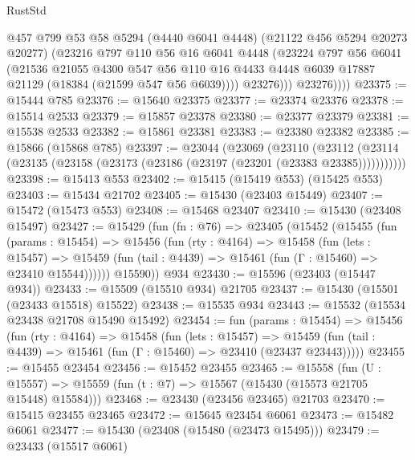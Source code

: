\begin{lexlean}{RustStd}
\begin{coremodule}
{\begin{coremodule}
{{{{{{{{{{{{{{{{{{{{{{{{{{{{{{{{{{{{{{{{{{{{{{{{{{{{{{{{{{{{                @457
                @799
                @53
                @58
                @5294
                (@4440 @6041 @4448)
                (@21122 @456 @5294 @20273 @20277)
                (@23216
                  @797
                  @110
                  @56
                  @16
                  @6041
                  @4448
                  (@23224
                    @797
                    @56
                    @6041
                    (@21536
                      @21055
                      @4300
                      @547
                      @56
                      @110
                      @16
                      @4433
                      @4448
                      @6039
                      @17887
                      @21129
                      (@18384 (@21599 @547 @56 @6039))))
                  @23276)))
            @23276))))
@23375 := @15444 @785
@23376 := @15640 @23375
@23377 := @23374 @23376
@23378 := @15514 @2533
@23379 := @15857 @23378
@23380 := @23377 @23379
@23381 := @15538 @2533
@23382 := @15861 @23381
@23383 := @23380 @23382
@23385 := @15866 (@15868 @785)
@23397 := @23044
    (@23069
      (@23110
        (@23112 (@23114 (@23135 (@23158 (@23173 (@23186 (@23197 (@23201 (@23383 @23385)))))))))))
@23398 := @15413 @553
@23402 := @15415 (@15419 @553) (@15425 @553)
@23403 := @15434 @21702
@23405 := @15430 (@23403 @15449)
@23407 := @15472 (@15473 @553)
@23408 := @15468 @23407
@23410 := @15430 (@23408 @15497)
@23427 := @15429
    (fun (fn : @76) =>
    @23405
      (@15452
        (@15455
          (fun (params : @15454) =>
          @15456
            (fun (rty : @4164) =>
            @15458
              (fun (lets : @15457) =>
              @15459 (fun (tail : @4439) => @15461 (fun (Γ : @15460) => @23410 @15544))))))
        @15590))
    @934
@23430 := @15596 (@23403 (@15447 @934))
@23433 := @15509 (@15510 @934) @21705
@23437 := @15430 (@15501 (@23433 @15518) @15522)
@23438 := @15535 @934
@23443 := @15532 (@15534 @23438 @21708 @15490 @15492)
@23454 := fun (params : @15454) =>
  @15456
    (fun (rty : @4164) =>
    @15458
      (fun (lets : @15457) =>
      @15459 (fun (tail : @4439) => @15461 (fun (Γ : @15460) => @23410 (@23437 @23443)))))
@23455 := @15455 @23454
@23456 := @15452 @23455
@23465 := @15558
    (fun (U : @15557) => @15559 (fun (t : @7) => @15567 (@15430 (@15573 @21705 @15448) @15584)))
@23468 := @23430 (@23456 @23465) @21703
@23470 := @15415 @23455 @23465
@23472 := @15645 @23454 @6061
@23473 := @15482 @6061
@23477 := @15430 (@23408 (@15480 (@23473 @15495)))
@23479 := @23433 (@15517 @6061)
}}}}}}}}}}}}}}}}}}}}}}}}}}}}}}}}}}}}}}}}}}}}}}}}}}}}}}}}}}}}
\end{coremodule}}
\end{coremodule}
\end{lexlean}
